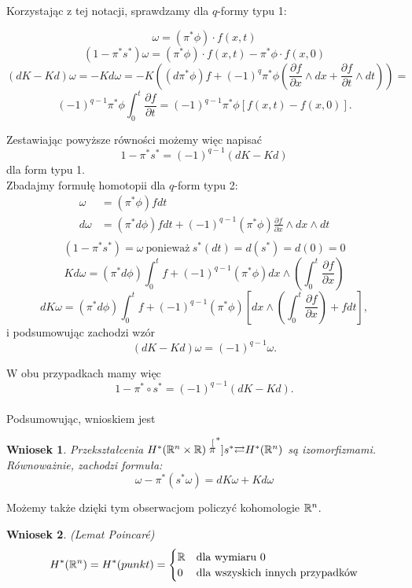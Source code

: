 \documentclass[licencjacka]{pracamgr}
\theoremstyle{definition}
\theoremstyle{definition}
\theoremstyle{plain}
\theoremstyle{plain}
\theoremstyle{plain}
\theoremstyle{plain}
\newtheorem{wniosek}{Wniosek}[section]
\def\R{\ensuremath\mathbb{R}}
\begin{document}
Korzystając z tej notacji, sprawdzamy dla $q$-formy typu 1:

\[
    \omega = (\pi^\ast \phi) \cdot f(x,t)
\]
\[
    (1 - \pi^\ast s^\ast) \omega =
       (\pi^\ast \phi) \cdot f(x,t) - \pi^\ast \phi \cdot f(x,0)
\]
\[
    (dK - Kd) \omega = - K d\omega = 
    -K \left(
    (d \pi^\ast \phi)f +
    (-1)^q \pi^\ast \phi \left(
       \frac{\partial f}{\partial x} \wedge dx +
       \frac{\partial f}{\partial t} \wedge dt
       \right)
    \right) =
\]
\[
    (-1)^{q-1}\pi^\ast \phi \int_0^t \frac{\partial f}{\partial t}
    = (-1)^{q-1} \pi^\ast \phi [f(x,t) - f(x,0)].
\]

Zestawiając powyższe równości możemy więc napisać
\[
    1 - \pi^\ast s^\ast = (-1)^{q-1}(dK - Kd)
\]
dla form typu 1. \\

Zbadajmy formułę homotopii dla $q$-form typu 2:
\begin{align*}
     \omega &= (\pi^\ast \phi)f dt \\
    d\omega &= (\pi^\ast d \phi)f dt + 
      (-1)^{q-1}(\pi^\ast \phi) \frac{\partial f}{\partial x} 
        \wedge dx \wedge dt \\
\end{align*}
\[
    (1 - \pi^\ast s^\ast) = \omega ~\text{ponieważ}~
     s^\ast(dt) = d(s^\ast) = d(0) = 0
\]
\[
    Kd\omega = (\pi^\ast d\phi) \int_0^tf +
      (-1)^{q-1} (\pi^\ast \phi)
          dx \wedge (\int_0^t \frac{\partial f}{\partial x})
\]
\[
    dK\omega = (\pi^\ast d\phi) \int_0^tf +
      (-1)^{q-1} (\pi^\ast \phi)
      \left[
          dx \wedge (\int_0^t \frac{\partial f}{\partial x})
          + f dt
      \right],
\]
i podsumowując zachodzi wzór
\[
    (dK - Kd) \omega = (-1)^{q-1} \omega.
\]

W obu przypadkach mamy więc 
\[
1 - \pi^\ast \circ s^\ast = (-1)^{q-1}(dK - Kd).
\] \\

Podsumowując, wnioskiem jest 
\begin{wniosek}\label{pi-is-isomorphism}
Przekształcenia $H^\ast (\R^n \times \R)
\stackrel[\pi^\ast]{s^\ast}{\rightleftarrows} H^\ast(\R^n)$ są izomorfizmami.
Równoważnie, zachodzi formuła:
\begin{equation}\label{homotopy-formula-pi}
    \omega - \pi^\ast( s^\ast \omega) = dK \omega + K d\omega
\end{equation}
\end{wniosek}


Możemy także dzięki tym obserwacjom policzyć kohomologie $\R^n$.
\begin{wniosek}(Lemat Poincaré)
\[
H^\ast(\R^n) = H^\ast(punkt) = 
\begin{cases}
\R & \text{dla wymiaru 0} \\
0 & \text{dla wszyskich innych przypadków} \\
\end{cases}
\]
\end{wniosek} 
\end{document}
